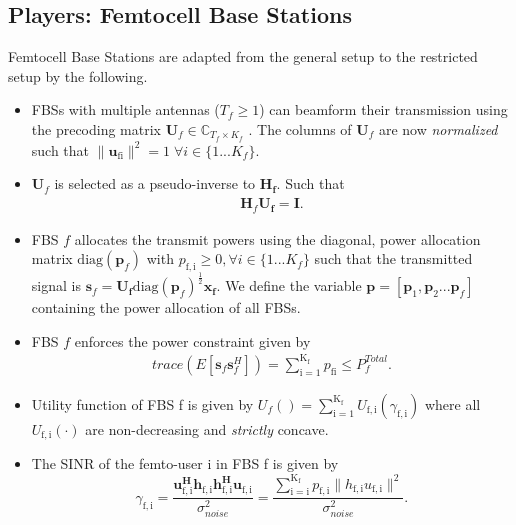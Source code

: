 \documentclass[12pt,a4paper]{report}
\begin{document}
\subsection{Players: Femtocell Base Stations}\label{conmodel_fbs}
Femtocell Base Stations are adapted from the general setup to the restricted setup by the following.
\begin{itemize}
\item 
	FBSs with multiple antennas ($T_f \geq 1$) can beamform their transmission using the precoding 	
	matrix $\mathbf{U}_{f} \in \mathbb{C}_{T_{f} \times K_{f}}$ .
	The columns of $\mathbf{U}_{f}$ are now \emph{normalized} such that 
	 $\|\mathbf{u}_{\mathrm{fi}}\|^2 =1 \;\forall i \in \{1 ... K_{f}\}$.
\\

\item 
$\mathbf{U}_f$ is selected as a pseudo-inverse to $\mathbf{H_f}$.
Such that
\begin{gather*}
\mathbf{H}_{f}  \mathbf{U_{f}} = \mathbf{I}.
\end{gather*} 


\item  
	FBS $f$ allocates the transmit powers using the diagonal, power allocation  	
	matrix $\mathrm{diag}(\mathbf{p}_{f})$ with $p_{\mathrm{f,i}} \geq 0, \forall i \in \{1 ... K_{f}\}$
such that the transmitted 		
	signal is 
	$\mathbf{s}_{f	}= \mathbf{U_{f}} 
	\mathrm{diag}(\mathbf{p}_{f})^{\frac{1}{2}}
	\mathbf{x_{f}}$. We define the variable $\mathbf{p}= [\mathbf{p}_1, \mathbf{p}_2...\mathbf{p}_{f}]$ containing the power allocation of all FBSs.
\\
\item 
	FBS $f$ enforces the power constraint given by
	\begin{gather*}
	trace(E[\mathbf{s}_f\mathbf{s}_f^H]) =
	\sum_{\mathrm{i=1}}^{\mathrm{K_{f}}} p_{\mathrm{fi}}
	  \leq P^{Total}_{f}.
	  	\end{gather*}




\item 
	Utility function of FBS f is given by $U_{f}() =
	\sum_{\mathrm{i=1}}^{\mathrm{K_{f}}}
    	U_{\mathrm{f,i}}(\gamma_{\mathrm{f,i}}) $
    	where all $U_{\mathrm{f,i}}(\cdot)$ are non-decreasing and
    	\emph{strictly} concave.
\item The SINR of the femto-user i in FBS f is given by
\begin{equation}\label{zf_snr}
	\gamma_{\mathrm{f,i}} = 	\frac{\mathbf{u^H_{\mathrm{f,i}}h_{\mathrm{f,i}}h^H_{\mathrm{f,i}}u_{\mathrm{f,i}}}}
	{\sigma^2_{noise}  
	}=\frac{\sum_{\mathrm{i=i}}^{\mathrm{K_{f}}}
 p_{\mathrm{f,i}}\|h_{\mathrm{f,i}}u_{\mathrm{f,i}}\|^2}
	{\sigma^2_{noise}  
	}.
	\end{equation}

\end{itemize}
\end{document}
